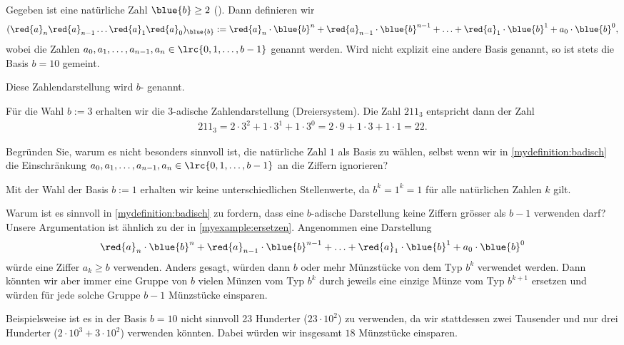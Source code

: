 \begin{mydefinition}
\label{mydefinition:badisch}
Gegeben ist eine natürliche Zahl $\blue{b}\geq 2$ (). Dann definieren wir
\begin{align*}
	(\red{a}_{n}\red{a}_{n-1}\ldots \red{a}_{1}\red{a}_{0})_{\blue{b}} := \red{a}_n\cdot \blue{b}^n + \red{a}_{n-1}\cdot \blue{b}^{n-1} + \ldots +\red{a}_1\cdot \blue{b}^1 + a_0\cdot
	\blue{b}^0,
\end{align*}
wobei die Zahlen $a_{0}, a_{1},\ldots, a_{n-1}, a_{n}\in\lrc{0,1,\ldots,b-1}$  genannt werden. Wird
nicht explizit eine andere Basis genannt, so ist stets die Basis $b=10$ gemeint.

Diese Zahlendarstellung wird $b$- genannt.
\end{mydefinition}

\begin{myexample}
Für die Wahl $b:=3$ erhalten wir die $3$-adische Zahlendarstellung (Dreiersystem). Die Zahl $211_3$ entspricht dann der Zahl
\begin{align*}
	211_3 = 2\cdot 3^2 + 1\cdot 3^1 + 1\cdot 3^0 = 2\cdot 9 + 1\cdot 3 + 1\cdot 1 = 22.
\end{align*}
\end{myexample}

\begin{mychallenge}
	Begründen Sie, warum es nicht besonders sinnvoll ist, die natürliche Zahl $1$ als Basis zu wählen, selbst wenn wir in \cref{mydefinition:badisch} die Einschränkung $a_0, a_1, \ldots, a_{n-1}, a_{n}\in\lrc{0,1,\ldots,b-1}$ an die Ziffern ignorieren?
	\begin{myanswer}
		Mit der Wahl der Basis $b := 1$ erhalten wir keine unterschiedlichen Stellenwerte, da $b^k = 1^k = 1$ für alle natürlichen Zahlen $k$ gilt.
	\end{myanswer}
\end{mychallenge}

\begin{myremark}
	Warum ist es sinnvoll in \cref{mydefinition:badisch} zu fordern, dass eine $b$-adische Darstellung keine Ziffern grösser als $b-1$ verwenden darf?
	Unsere Argumentation ist ähnlich zu der in \cref{myexample:ersetzen}. Angenommen eine Darstellung
	\begin{align*}
		\red{a}_n\cdot \blue{b}^n + \red{a}_{n-1}\cdot \blue{b}^{n-1} + \ldots +\red{a}_1\cdot \blue{b}^1 + a_0\cdot
		\blue{b}^0
	\end{align*}
	würde eine Ziffer $a_k \geq b$ verwenden. Anders gesagt, würden dann $b$ oder mehr Münzstücke von dem Typ $b^k$ verwendet werden.
	Dann könnten wir aber immer eine Gruppe von $b$ vielen Münzen vom Typ $b^k$ durch jeweils eine einzige Münze vom Typ $b^{k+1}$ ersetzen und würden für jede solche Gruppe $b-1$ Münzstücke einsparen.

	Beispielsweise ist es in der Basis $b = 10$ nicht sinnvoll 23 Hunderter ($23\cdot 10^2$) zu verwenden, da wir stattdessen zwei Tausender und nur drei Hunderter ($2\cdot 10^3 + 3\cdot 10^2$) verwenden könnten.
	Dabei würden wir insgesamt $18$ Münzstücke einsparen.
\end{myremark}

